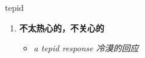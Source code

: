 
\begin{frame}
{\huge tepid}
\begin{center}
\begin{enumerate}\Large
  \item \textbf{不太热心的，不关心的}
  \begin{itemize}
    \item \em{\Large{a tepid response 冷漠的回应}}
  \end{itemize}
\end{enumerate}
\end{center}
\end{frame}
